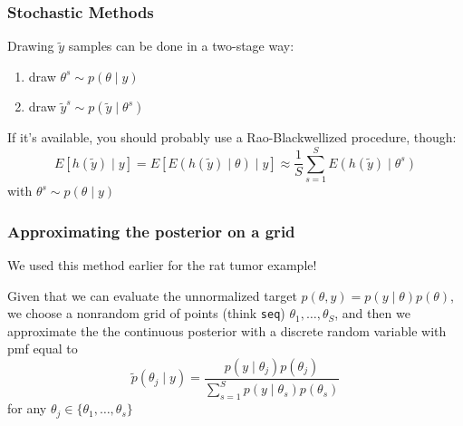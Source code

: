 \documentclass{beamer}
\begin{document}
\begin{frame}
\frametitle{Stochastic Methods}

Drawing $\tilde{y}$ samples can be done in a two-stage way:
\begin{enumerate}
\item draw $\theta^s \sim p(\theta \mid y)$
\item draw $\tilde{y}^s \sim p(\tilde{y} \mid \theta^s)$
\end{enumerate}
\pause

If it's available, you should probably use a Rao-Blackwellized procedure, though:
\[
E[h(\tilde{y}) \mid y] = E[E\left( h(\tilde{y}) \mid \theta \right) \mid y] \approx \frac{1}{S} \sum_{s=1}^S E\left( h(\tilde{y}) \mid \theta^s \right)
\]
with $\theta^s \sim p(\theta \mid y)$


\end{frame}
\begin{frame}[fragile]
\frametitle{Approximating the posterior on a grid}

We used this method earlier for the rat tumor example!
\newline

Given that we can evaluate the unnormalized target $p(\theta, y) = p(y \mid \theta)p(\theta)$, we choose a nonrandom grid of points (think \verb|seq|) $\theta_1, \ldots, \theta_S$, and then we approximate the the continuous posterior with a discrete random variable with pmf equal to
\[
\tilde{p}(\theta_j \mid y) = \frac{p(y \mid \theta_j)p(\theta_j)}{\sum_{s=1}^S p(y \mid \theta_s)p(\theta_s) }
\]
for any $\theta_j \in \{\theta_1, \ldots, \theta_s\}$

\end{frame}
\end{document}
